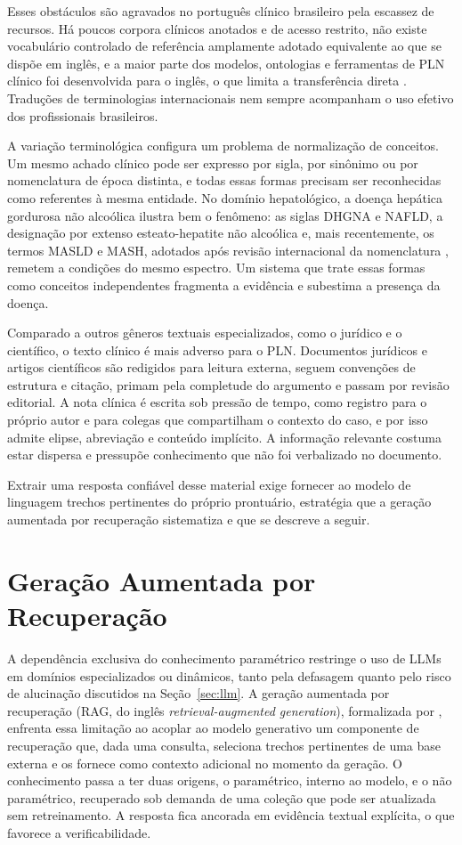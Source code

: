Esses obstáculos são agravados no português clínico brasileiro pela escassez de recursos. Há poucos corpora clínicos anotados e de acesso restrito, não existe vocabulário controlado de referência amplamente adotado equivalente ao que se dispõe em inglês, e a maior parte dos modelos, ontologias e ferramentas de PLN clínico foi desenvolvida para o inglês, o que limita a transferência direta \citep{stammers2025,omar2025}. Traduções de terminologias internacionais nem sempre acompanham o uso efetivo dos profissionais brasileiros.

A variação terminológica configura um problema de normalização de conceitos. Um mesmo achado clínico pode ser expresso por sigla, por sinônimo ou por nomenclatura de época distinta, e todas essas formas precisam ser reconhecidas como referentes à mesma entidade. No domínio hepatológico, a doença hepática gordurosa não alcoólica ilustra bem o fenômeno: as siglas DHGNA e NAFLD, a designação por extenso esteato-hepatite não alcoólica e, mais recentemente, os termos MASLD e MASH, adotados após revisão internacional da nomenclatura \citep{rinella2023}, remetem a condições do mesmo espectro. Um sistema que trate essas formas como conceitos independentes fragmenta a evidência e subestima a presença da doença.

Comparado a outros gêneros textuais especializados, como o jurídico e o científico, o texto clínico é mais adverso para o PLN. Documentos jurídicos e artigos científicos são redigidos para leitura externa, seguem convenções de estrutura e citação, primam pela completude do argumento e passam por revisão editorial. A nota clínica é escrita sob pressão de tempo, como registro para o próprio autor e para colegas que compartilham o contexto do caso, e por isso admite elipse, abreviação e conteúdo implícito. A informação relevante costuma estar dispersa e pressupõe conhecimento que não foi verbalizado no documento.

Extrair uma resposta confiável desse material exige fornecer ao modelo de linguagem trechos pertinentes do próprio prontuário, estratégia que a geração aumentada por recuperação sistematiza e que se descreve a seguir.

\section{Geração Aumentada por Recuperação}\label{sec:rag}

A dependência exclusiva do conhecimento paramétrico restringe o uso de LLMs em domínios especializados ou dinâmicos, tanto pela defasagem quanto pelo risco de alucinação discutidos na Seção~\ref{sec:llm}. A geração aumentada por recuperação (RAG, do inglês \textit{retrieval-augmented generation}), formalizada por \citet{lewis2020}, enfrenta essa limitação ao acoplar ao modelo generativo um componente de recuperação que, dada uma consulta, seleciona trechos pertinentes de uma base externa e os fornece como contexto adicional no momento da geração. O conhecimento passa a ter duas origens, o paramétrico, interno ao modelo, e o não paramétrico, recuperado sob demanda de uma coleção que pode ser atualizada sem retreinamento. A resposta fica ancorada em evidência textual explícita, o que favorece a verificabilidade.

